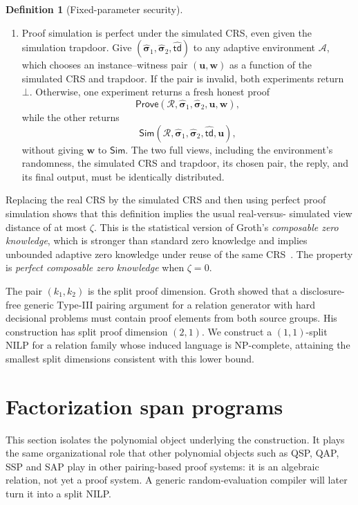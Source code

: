 \documentclass[11pt]{article}
\theoremstyle{definition}
\newtheorem{definition}[theorem]{Definition}
\newcommand{\cR}{\mathcal R}
\newcommand{\Prove}{\mathsf{Prove}}
\newcommand{\Sim}{\mathsf{Sim}}
\newcommand{\td}{\mathsf{td}}
\begin{document}
\begin{definition}[Fixed-parameter security]
\begin{enumerate}
\begin{enumerate}[label=(\alph*)]
    \item Proof simulation is perfect under the simulated CRS, even given the
    simulation trapdoor.  Give
    $(\widehat{\boldsymbol{\sigma}}_1,
      \widehat{\boldsymbol{\sigma}}_2,\widehat{\td})$ to any adaptive environment
    $\mathcal A$, which chooses an instance--witness pair
    $(\mathbf u,\mathbf w)$ as a function of the simulated CRS and trapdoor.
    If the pair is
    invalid, both experiments return $\bot$.  Otherwise, one experiment
    returns a fresh honest proof
    \[
      \Prove(\cR,\widehat{\boldsymbol{\sigma}}_1,
             \widehat{\boldsymbol{\sigma}}_2,\mathbf u,\mathbf w),
    \]
    while the other returns
    \[
      \Sim(\cR,\widehat{\boldsymbol{\sigma}}_1,
           \widehat{\boldsymbol{\sigma}}_2,\widehat{\td},\mathbf u),
    \]
    without giving $\mathbf w$ to $\Sim$.  The two full views, including the
    environment's randomness, the simulated CRS and trapdoor, its chosen pair,
    the reply, and its final output, must be identically distributed.
  \end{enumerate}
  Replacing the real CRS by the simulated CRS and then using perfect proof
  simulation shows that this definition implies the usual real-versus-
  simulated view distance of at most $\zeta$.  This is the statistical version
  of Groth's \emph{composable zero knowledge}, which is stronger than standard
  zero knowledge and implies unbounded adaptive zero knowledge under reuse of
  the same CRS~\cite{Groth06CZK}.  The property is \emph{perfect composable
  zero knowledge} when $\zeta=0$.
\end{enumerate}
\end{definition}

The pair $(k_1,k_2)$ is the split proof dimension.  Groth showed that a
disclosure-free generic Type-III pairing argument for a relation generator
with hard decisional problems must contain proof elements from both source
groups.  His construction has split proof dimension $(2,1)$.  We construct a
$(1,1)$-split NILP for a relation family whose induced language is NP-complete,
attaining the smallest split dimensions consistent with this lower bound.

\section{Factorization span programs}
\label{sec:fsp}

This section isolates the polynomial object underlying the construction.  It
plays the same organizational role that other polynomial objects such as QSP, QAP, SSP and SAP play in other
pairing-based proof systems: it is an algebraic relation, not yet
a proof system.  A generic random-evaluation compiler will later turn it into
a split NILP.
\end{document}
